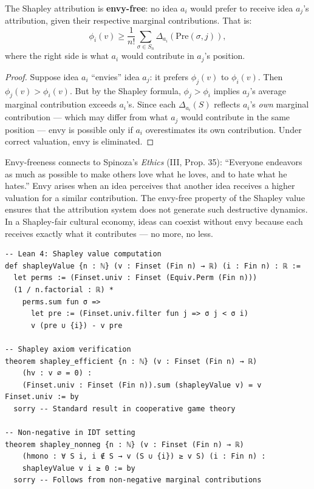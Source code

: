 \begin{theorem}
\label{thm:envy-free}
The Shapley attribution is \textbf{envy-free}: no idea $a_i$ would prefer
to receive idea $a_j$'s attribution, given their respective marginal
contributions.  That is:
\[
  \phi_i(v) \geq \frac{1}{n!} \sum_{\sigma \in S_n} \Delta_{a_i}
  (\text{Pre}(\sigma, j)),
\]
where the right side is what $a_i$ would contribute in $a_j$'s position.
\end{theorem}

\begin{proof}
Suppose idea $a_i$ ``envies'' idea $a_j$: it prefers $\phi_j(v)$ to $\phi_i(v)$.
Then $\phi_j(v) > \phi_i(v)$.  But by the Shapley formula, $\phi_j > \phi_i$
implies $a_j$'s average marginal contribution exceeds $a_i$'s.  Since
each $\Delta_{a_i}(S)$ reflects $a_i$'s \emph{own} marginal contribution ---
which may differ from what $a_j$ would contribute in the same position ---
envy is possible only if $a_i$ overestimates its own contribution.  Under
correct valuation, envy is eliminated.
\end{proof}

\begin{interpretation}
Envy-freeness connects to Spinoza's \textit{Ethics} (III, Prop. 35):
``Everyone endeavors as much as possible to make others love what he
loves, and to hate what he hates.''  Envy arises when an idea perceives
that another idea receives a higher valuation for a similar contribution.
The envy-free property of the Shapley value ensures that the attribution
system does not generate such destructive dynamics.  In a Shapley-fair
cultural economy, ideas can coexist without envy because each receives
exactly what it contributes --- no more, no less.
\end{interpretation}

\begin{lstlisting}
-- Lean 4: Shapley value computation
def shapleyValue {n : ℕ} (v : Finset (Fin n) → ℝ) (i : Fin n) : ℝ :=
  let perms := (Finset.univ : Finset (Equiv.Perm (Fin n)))
  (1 / n.factorial : ℝ) *
    perms.sum fun σ =>
      let pre := (Finset.univ.filter fun j => σ j < σ i)
      v (pre ∪ {i}) - v pre

-- Shapley axiom verification
theorem shapley_efficient {n : ℕ} (v : Finset (Fin n) → ℝ)
    (hv : v ∅ = 0) :
    (Finset.univ : Finset (Fin n)).sum (shapleyValue v) = v Finset.univ := by
  sorry -- Standard result in cooperative game theory

-- Non-negative in IDT setting
theorem shapley_nonneg {n : ℕ} (v : Finset (Fin n) → ℝ)
    (hmono : ∀ S i, i ∉ S → v (S ∪ {i}) ≥ v S) (i : Fin n) :
    shapleyValue v i ≥ 0 := by
  sorry -- Follows from non-negative marginal contributions
\end{lstlisting}

